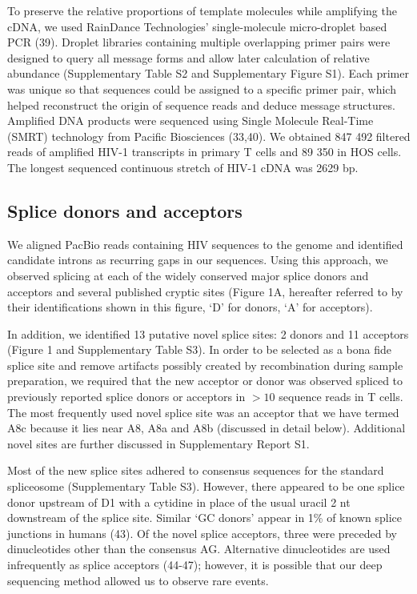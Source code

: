 \documentclass[../sherrill-Mix_thesis.tex]{subfiles}
\begin{document}
To preserve the relative proportions of template molecules while amplifying the cDNA, we used RainDance Technologies' single-molecule micro-droplet based PCR (39). Droplet libraries containing multiple overlapping primer pairs were designed to query all message forms and allow later calculation of relative abundance (Supplementary Table S2 and Supplementary Figure S1). Each primer was unique so that sequences could be assigned to a specific primer pair, which helped reconstruct the origin of sequence reads and deduce message structures. Amplified DNA products were sequenced using Single Molecule Real-Time (SMRT) technology from Pacific Biosciences (33,40). We obtained 847 492 filtered reads of amplified HIV-1 transcripts in primary \cdFour{} T cells and 89 350 in HOS cells. The longest sequenced continuous stretch of HIV-1 cDNA was 2629 bp. 


\subsection{Splice donors and acceptors}
We aligned PacBio reads containing HIV sequences to the \hivEight{} genome and identified candidate introns as recurring gaps in our sequences. Using this approach, we observed splicing at each of the widely conserved major splice donors and acceptors and several published cryptic sites (Figure 1A, hereafter referred to by their identifications shown in this figure, `D' for donors, `A' for acceptors).

In addition, we identified 13 putative novel splice sites: 2 donors and 11 acceptors (Figure 1 and Supplementary Table S3). In order to be selected as a bona fide splice site and remove artifacts possibly created by recombination during sample preparation, we required that the new acceptor or donor was observed spliced to previously reported splice donors or acceptors in $>10$ sequence reads in \cdFour{} T cells. The most frequently used novel splice site was an acceptor that we have termed A8c because it lies near A8, A8a and A8b (discussed in detail below). Additional novel sites are further discussed in Supplementary Report S1.

Most of the new splice sites adhered to consensus sequences for the standard spliceosome (Supplementary Table S3). However, there appeared to be one splice donor upstream of D1 with a cytidine in place of the usual uracil 2 nt downstream of the splice site. Similar `GC donors' appear in 1\% of known splice junctions in humans (43). Of the novel splice acceptors, three were preceded by dinucleotides other than the consensus AG. Alternative dinucleotides are used infrequently as splice acceptors (44-47); however, it is possible that our deep sequencing method allowed us to observe rare events. 
\end{document}

